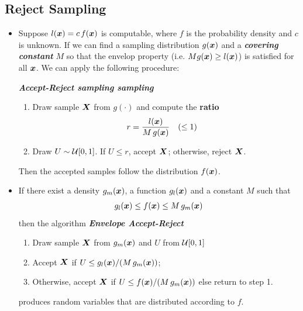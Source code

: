 \documentclass[11pt]{article}
\begin{document}
\subsection{Reject Sampling}
\begin{itemize}
\item  Suppose $l(\boldsymbol{x}) = c\,f(\boldsymbol{x})$ is computable, where $f$ is the probability density and $c$ is unknown. If we can find a sampling distribution $g(\boldsymbol{x})$ and a \emph{\textbf{covering constant}} $M$ so that the envelop property (i.e. $M g(\boldsymbol{x}) \ge l(\boldsymbol{x})$) is satisfied for all $\boldsymbol{x}$. We can apply the following procedure:

\emph{\textbf{Accept-Reject sampling sampling}} \citep{liu2001monte}
\begin{enumerate}
\item Draw sample $\boldsymbol{X}$ from $g(\cdot)$ and compute the \textbf{ratio}
\begin{align*}
r &= \frac{l(\boldsymbol{x})}{M\,g(\boldsymbol{x})}\quad (\le 1)
\end{align*}
\item Draw $U \sim {\mathcal U}[0,1]$. If $U \le r$, accept $\boldsymbol{X}$; otherwise, reject $\boldsymbol{X}$.
\end{enumerate} 
Then the accepted samples follow the distribution $f(\boldsymbol{x})$.

\item \begin{lemma}
If there exist a density $g_{m}(\boldsymbol{x})$, a function $g_{l}(\boldsymbol{x})$ and a constant $M$ such that
\begin{align*}
g_l(\boldsymbol{x}) \le f(\boldsymbol{x}) \le M\,g_{m}(\boldsymbol{x}) 
\end{align*}
then the algorithm \emph{\textbf{Envelope Accept-Reject}}
\begin{enumerate}
\item Draw sample $\boldsymbol{X}$ from $g_{m}(\boldsymbol{x})$ and $U$ from ${\mathcal U}[0,1]$

\item Accept $\boldsymbol{X}$ if $U\le g_{l}(\boldsymbol{x})/(M\,g_{m}(\boldsymbol{x}))$; 

\item Otherwise, accept $\boldsymbol{X}$ if $U\le f(\boldsymbol{x})/(M\,g_{m}(\boldsymbol{x}))$ else return to step 1.
\end{enumerate}
produces random variables that are distributed according to $f$.
\end{lemma}
\end{itemize}
\end{document}
